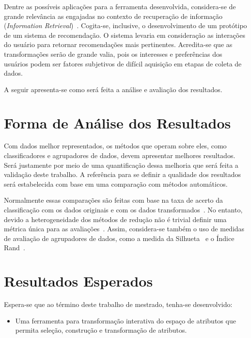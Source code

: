 Dentre as possíveis aplicações para a ferramenta
desenvolvida, considera-se de grande relevância as
engajadas no contexto de recuperação de informação
(\emph{Information Retrieval})~\cite{Manning2008}.
Cogita-se, inclusive, o desenvolvimento de um protótipo de um
sistema de recomendação. O sistema levaria em consideração
as interações do usuário para retornar recomendações mais
pertinentes. Acredita-se que as transformações serão de
grande valia, pois os interesses e preferências dos usuários
podem ser fatores subjetivos de difícil aquisição em etapas
de coleta de dados.

A seguir apresenta-se como será feita a análise e avaliação
dos resultados.

\section{Forma de Análise dos Resultados}

Com dados melhor representados, os métodos que operam sobre
eles, como classificadores e agrupadores de dados, devem
apresentar melhores resultados. Será justamente por meio de uma
quantificação dessa melhoria que será feita a validação 
deste trabalho. A referência para se definir a qualidade dos
resultados será estabelecida com base em uma comparação com
métodos automáticos.

Normalmente essas comparações são feitas com base na taxa de
acerto da classificação com os dados originais e com os
dados transformados~\cite{Guyon2003,Joshi2007}. No entanto,
devido a heterogeneidade dos métodos de redução não é
trivial definir uma métrica única para as
avaliações~\cite{Medeiros2011}. Assim, considera-se também o
uso de medidas de avaliação de agrupadores de dados, como a
medida da Silhueta~\cite{Rousseeuw1987} e o Índice
Rand~\cite{Rand1971}.

\section{Resultados Esperados}

Espera-se que ao término deste trabalho de mestrado,
tenha-se desenvolvido:

\begin{itemize}
    \item Uma ferramenta para
        transformação interativa do espaço de atributos que
        permita seleção, construção e transformação de
        atributos.
\end{itemize}

